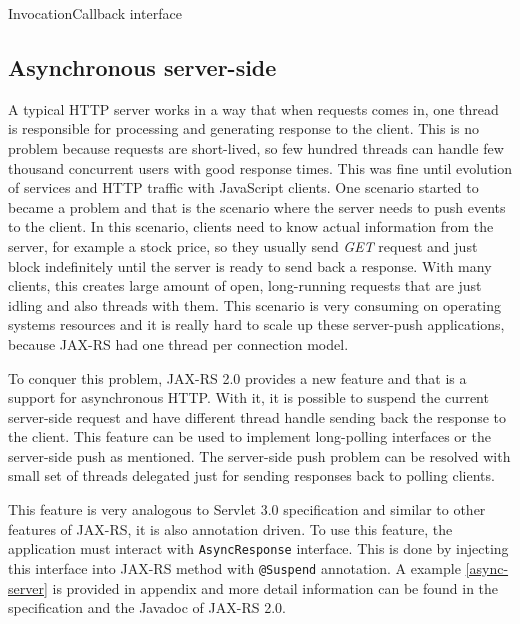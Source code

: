 \documentclass[12pt,final,oneside]{fithesis2}
\begin{document}
\begin{listing}[ht]
	\inputminted[]{java}{sources/callback.java}
	\caption{InvocationCallback interface}
	\label{callback}
\end{listing}

\subsection*{Asynchronous server-side}
A typical HTTP server works in a way that when requests comes in, one thread is responsible for processing and generating response to the client. This is no problem because requests are short-lived, so few hundred threads can handle few thousand concurrent users with good response times. This was fine until evolution of services and HTTP traffic with JavaScript clients. One scenario started to became a problem and that is the scenario where the server needs to push events to the client. In this scenario, clients need to know actual information from the server, for example a stock price, so they usually send \textit{GET} request and just block indefinitely until the server is ready to send back a response. With many clients, this creates large amount of open, long-running requests that are just idling and also threads with them. This scenario is very consuming on operating systems resources and it is really hard to scale up these server-push applications, because JAX-RS had one thread per connection model.\cite{resteasy-book}

To conquer this problem, JAX-RS 2.0 provides a new feature and that is a support for asynchronous HTTP. With it, it is possible to suspend the current server-side request and have different thread handle sending back the response to the client. This feature can be used to implement long-polling interfaces or the server-side push as mentioned. The server-side push problem can be resolved with small set of threads delegated just for sending  responses back to polling clients.

This feature is very analogous to Servlet 3.0 specification and similar to other features of JAX-RS, it is also annotation driven. To use this feature, the application must interact with \texttt{AsyncResponse} interface. This is done by injecting this interface into JAX-RS method with \texttt{@Suspend} annotation.\cite{resteasy-book}\cite{jax-rs-2.0} A example  \ref{async-server} is provided in appendix and more detail information can be found in the specification and the Javadoc of JAX-RS 2.0.
\end{document}
